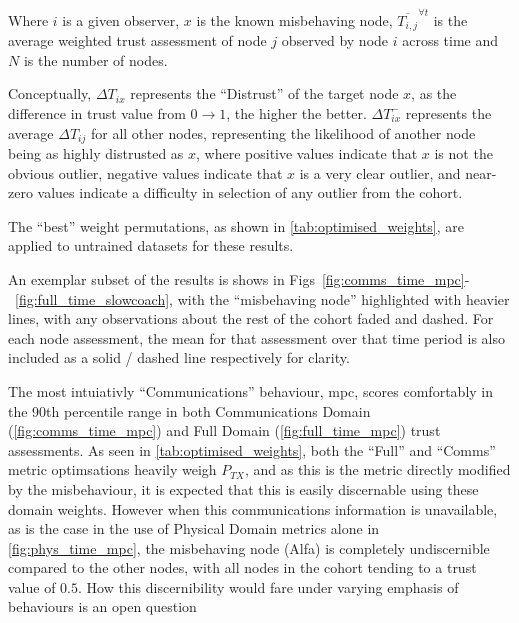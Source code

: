 Where $i$ is a given observer, $x$ is the known misbehaving node, $\overline{T_{i,j}}^{\forall t}$ is the average weighted trust assessment of node $j$ observed by node $i$ across time and $N$ is the number of nodes.

Conceptually, $\Delta T_{ix}$ represents the ``Distrust'' of the target node $x$, as the difference in trust value from $0\to1$, the higher the better. 
$\Delta T_{ix}^-$ represents the average $\Delta T_{ij}$ for all other nodes, representing the likelihood of another node being as highly distrusted as $x$, where positive values indicate that $x$ is not the obvious outlier, negative values indicate that $x$ is a very clear outlier, and near-zero values indicate a difficulty in selection of any outlier from the cohort.



The ``best'' weight permutations, as shown in \autoref{tab:optimised_weights}, are applied to untrained datasets for these results.

An exemplar subset of the results is shows in Figs~\ref{fig:comms_time_mpc}-~\ref{fig:full_time_slowcoach}, with the ``misbehaving node'' highlighted with heavier lines, with any observations about the rest of the cohort faded and dashed. For each node assessment, the mean for that assessment over that time period is also included as a solid / dashed line respectively for clarity.

The most intuiativly ``Communications'' behaviour, \gls{mpc}, scores comfortably in the 90th percentile range in both Communications Domain (\autoref{fig:comms_time_mpc}) and Full Domain (\autoref{fig:full_time_mpc})  trust assessments. As seen in \autoref{tab:optimised_weights}, both the ``Full'' and ``Comms'' metric optimsations heavily weigh $P_{TX}$, and as this is the metric directly modified by the misbehaviour, it is expected that this is easily discernable using these domain weights.
However when this communications information is unavailable, as is the case in the use of Physical Domain metrics alone in \autoref{fig:phys_time_mpc}, the misbehaving node (Alfa) is completely undiscernible compared to the other nodes, with all nodes in the cohort tending to a trust value of $0.5$.
How this discernibility would fare under varying emphasis of behaviours is an open question

